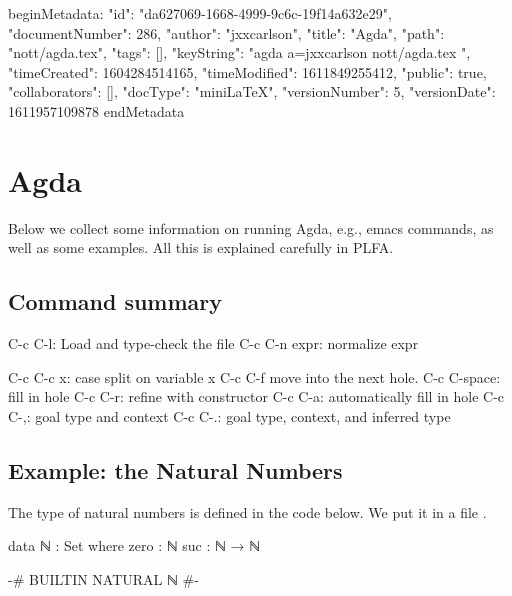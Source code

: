 beginMetadata:
{
    "id": "da627069-1668-4999-9c6c-19f14a632e29",
    "documentNumber": 286,
    "author": "jxxcarlson",
    "title": "Agda",
    "path": "nott/agda.tex",
    "tags": [],
    "keyString": "agda a=jxxcarlson nott/agda.tex ",
    "timeCreated": 1604284514165,
    "timeModified": 1611849255412,
    "public": true,
    "collaborators": [],
    "docType": "miniLaTeX",
    "versionNumber": 5,
    "versionDate": 1611957109878
}
endMetadata



\setcounter{section}{3}

\section{Agda}

\innertableofcontents



Below we collect some information on running Agda, e.g., emacs commands, as well as some examples.  All this is explained carefully in PLFA.

\subsection{Command summary}

\begin{colored}[bash]
C-c C-l: Load and type-check the file
C-c C-n expr: normalize expr

C-c C-c x: case split on variable x
C-c C-f move into the next hole.
C-c C-space: fill in hole
C-c C-r: refine with constructor
C-c C-a: automatically fill in hole
C-c C-,: goal type and context
C-c C-.: goal type, context, and inferred type
\end{colored}


\subsection{Example: the Natural Numbers}

The type of natural numbers is defined in the code below.  We put it in a file .

\begin{colored}[elm]
data ℕ : Set where
    zero : ℕ
    suc  : ℕ → ℕ
  
{-# BUILTIN NATURAL ℕ #-}
\end{colored}

